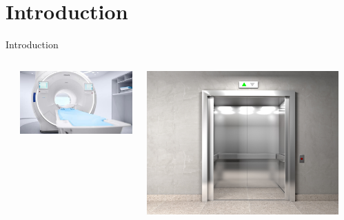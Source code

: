 \section*{Introduction}

\begin{frame}{Introduction}
\begin{columns}[c]
    \begin{column}{0.05\textwidth}
    \end{column}\begin{column}{0.3\textwidth}
        \includegraphics[width=\textwidth]{images/01_introduction/mri.jpg}
    \end{column}\begin{column}{0.3\textwidth}
        \includegraphics[width=\textwidth]{images/01_introduction/elevator.jpg}
    \end{column}\begin{column}{0.3\textwidth}

\end{column}
\end{columns}
\end{frame}
